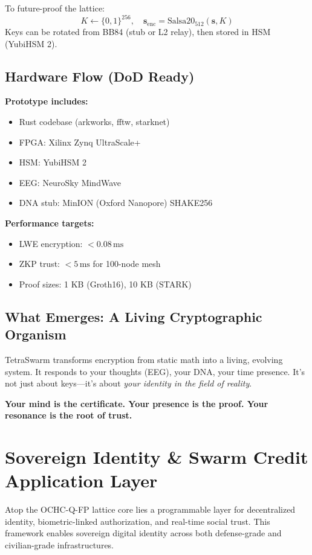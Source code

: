 \documentclass{article}
\begin{document}
To future-proof the lattice:
\[
K \leftarrow \{0,1\}^{256}, \quad \mathbf{s}_{\text{enc}} = \text{Salsa20}_{512}(\mathbf{s}, K)
\]
Keys can be rotated from BB84 (stub or L2 relay), then stored in HSM (YubiHSM 2).

\subsection*{Hardware Flow (DoD Ready)}

\textbf{Prototype includes:}
\begin{itemize}
    \item Rust codebase (arkworks, fftw, starknet)
    \item FPGA: Xilinx Zynq UltraScale+
    \item HSM: YubiHSM 2
    \item EEG: NeuroSky MindWave
    \item DNA stub: MinION (Oxford Nanopore) SHAKE256
\end{itemize}

\textbf{Performance targets:}
\begin{itemize}
    \item LWE encryption: \( <0.08 \, \text{ms} \)
    \item ZKP trust: \( <5 \, \text{ms} \) for 100-node mesh
    \item Proof sizes: 1 KB (Groth16), 10 KB (STARK)
\end{itemize}

\subsection*{What Emerges: A Living Cryptographic Organism}

TetraSwarm transforms encryption from static math into a living, evolving system. It responds to your thoughts (EEG), your DNA, your time presence. It’s not just about keys—it's about \textit{your identity in the field of reality}.

\textbf{Your mind is the certificate. Your presence is the proof. Your resonance is the root of trust.}
\section*{Sovereign Identity \& Swarm Credit Application Layer}

Atop the OCHC-Q-FP lattice core lies a programmable layer for decentralized identity, biometric-linked authorization, and real-time social trust. This framework enables sovereign digital identity across both defense-grade and civilian-grade infrastructures.
\end{document}
